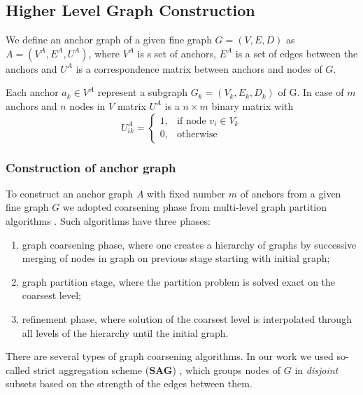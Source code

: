 \subsection{Higher Level Graph Construction}


We define an anchor graph of a given fine graph $G = (V,E,D)$ as $A = (V^A,E^A, U^A)$, where $V^A$ is s set of anchors, $E^{A}$ is a set of edges between the anchors and $U^{A}$ is a correspondence matrix between anchors and nodes of $G$.

Each anchor $a_k\in V^A$ represent a subgraph $G_k = (V_k,E_k, D_k)$ of G. In case of $m$ anchors and $n$ nodes in $V$  matrix $U^{A}$ is a $n\times m$ binary matrix with 
$$U^{A}_{ik} = \begin{cases} 1, & \mbox{if node } v_i\in V_k    \\
	                         0, & \mbox{otherwise} \end{cases} $$	 
	                                                 
\subsubsection{Construction of anchor graph}	                         
To construct an anchor graph $A$ with fixed number $m$ of anchors from a given fine graph $G$ we adopted coarsening phase from multi-level graph partition algorithms \cite{Chevalier09_GP, Safro2012_GC, Karypis95_GP, Hendrickson1995}.
Such algorithms have three phases: 
\begin{enumerate}
	\item graph coarsening phase, where one creates a hierarchy of graphs by successive merging of nodes in graph on previous stage starting with initial graph;
	\item graph partition stage, where the partition problem is solved exact on the coarsest level;
	\item refinement phase, where solution of the coarsest level is interpolated through all levels of the hierarchy until the initial graph.
\end{enumerate}
There are several types of graph coarsening algorithms. In our work we used so-called strict aggregation scheme (\textbf{SAG}) \cite{Chevalier09_GP}, which groups nodes of $G$ in \emph{disjoint} subsets based on the strength of the edges between them. 

